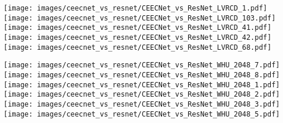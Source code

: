 \documentclass[times, 5p]{elsarticle}
\def \FracTAL {\texttt{FracTAL} }
\newcommand{\ceecnet}{\texttt{CEECNet}}
\newcommand{\mantis}{\texttt{mantis}}
\begin{document}
\begin{figure*}
\centering
\texttt{[image: images/ceecnet\_vs\_resnet/CEECNet\_vs\_ResNet\_LVRCD\_1.pdf]}
\texttt{[image: images/ceecnet\_vs\_resnet/CEECNet\_vs\_ResNet\_LVRCD\_103.pdf]}
\texttt{[image: images/ceecnet\_vs\_resnet/CEECNet\_vs\_ResNet\_LVRCD\_41.pdf]}
\texttt{[image: images/ceecnet\_vs\_resnet/CEECNet\_vs\_ResNet\_LVRCD\_42.pdf]}
\texttt{[image: images/ceecnet\_vs\_resnet/CEECNet\_vs\_ResNet\_LVRCD\_68.pdf]}
\caption{Samples of relative quality change detection on test tiles of size  from the LEVIRCD dataset. For each row from left to right: input image date 1, input image date 2, ground truth, confidence heat maps of \mantis{} \ceecnet V1 and \mantis{} \FracTAL \texttt{ResNet} respectively. } 
\label{ceecnet_vs_resnet_lvrcd}
\end{figure*}



\begin{figure*}
\centering
\texttt{[image: images/ceecnet\_vs\_resnet/CEECNet\_vs\_ResNet\_WHU\_2048\_7.pdf]}
\texttt{[image: images/ceecnet\_vs\_resnet/CEECNet\_vs\_ResNet\_WHU\_2048\_8.pdf]}
\texttt{[image: images/ceecnet\_vs\_resnet/CEECNet\_vs\_ResNet\_WHU\_2048\_1.pdf]}
\texttt{[image: images/ceecnet\_vs\_resnet/CEECNet\_vs\_ResNet\_WHU\_2048\_2.pdf]}
\texttt{[image: images/ceecnet\_vs\_resnet/CEECNet\_vs\_ResNet\_WHU\_2048\_3.pdf]}
\texttt{[image: images/ceecnet\_vs\_resnet/CEECNet\_vs\_ResNet\_WHU\_2048\_5.pdf]}
\caption{As in Fig. \ref{ceecnet_vs_resnet_lvrcd} for sample windows of size  from the WHU dataset.} 
\label{ceecnet_vs_resnet_whu}
\end{figure*}
\end{document}
